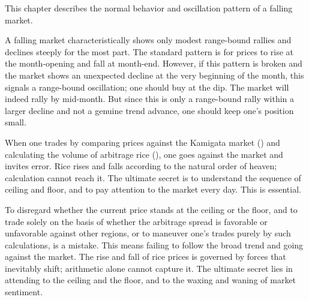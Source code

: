 \commentary
This chapter describes the normal behavior and oscillation pattern of a
falling market.

A falling market characteristically shows only modest range-bound
rallies and declines steeply for the most part. The standard pattern is
for prices to rise at the month-opening and fall at month-end. However,
if this pattern is broken and the market shows an unexpected decline at
the very beginning of the month, this signals a range-bound oscillation;
one should buy at the dip. The market will indeed rally by mid-month.
But since this is only a range-bound rally within a larger decline and
not a genuine trend advance, one should keep one's position small.


\begin{sokyubox}
{\small\itshape\color{sokyubar} }

\medskip
When one trades by comparing prices against the Kamigata market
() and calculating the volume of arbitrage
rice (), one goes against the market and invites
error. Rice rises and falls according to the natural order of heaven;
calculation cannot reach it. The ultimate secret is to understand the
sequence of ceiling and floor, and to pay attention to the market every
day. This is essential.
\end{sokyubox}

\commentary
To disregard whether the current price stands at the ceiling or the
floor, and to trade solely on the basis of whether the arbitrage spread
is favorable or unfavorable against other regions, or to maneuver one's
trades purely by such calculations, is a mistake. This means failing to
follow the broad trend and going against the market. The rise and fall of
rice prices is governed by forces that inevitably shift; arithmetic alone
cannot capture it. The ultimate secret lies in attending to the ceiling
and the floor, and to the waxing and waning of market sentiment.


